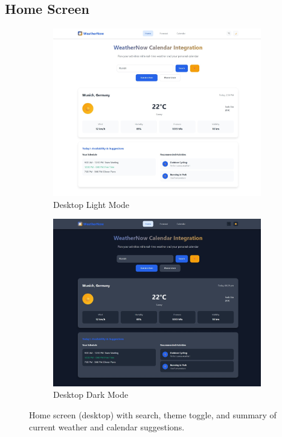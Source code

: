 \documentclass[11pt,a4paper]{article}
\begin{document}
\subsection{Home Screen}
\FloatBarrier
\begin{figure}[H]
  \centering
  \begin{subfigure}{0.48\linewidth}
    \includegraphics[width=\linewidth]{home_lightmode.jpeg}
    \caption{Desktop Light Mode}
  \end{subfigure}\hfill
  \begin{subfigure}{0.48\linewidth}
    \includegraphics[width=\linewidth]{home_darkmode.jpeg}
    \caption{Desktop Dark Mode}
  \end{subfigure}
  \caption{Home screen (desktop) with search, theme toggle, and summary of current weather and calendar suggestions.}
  \label{fig:home_desktop}
\end{figure}
\FloatBarrier
\end{document}
